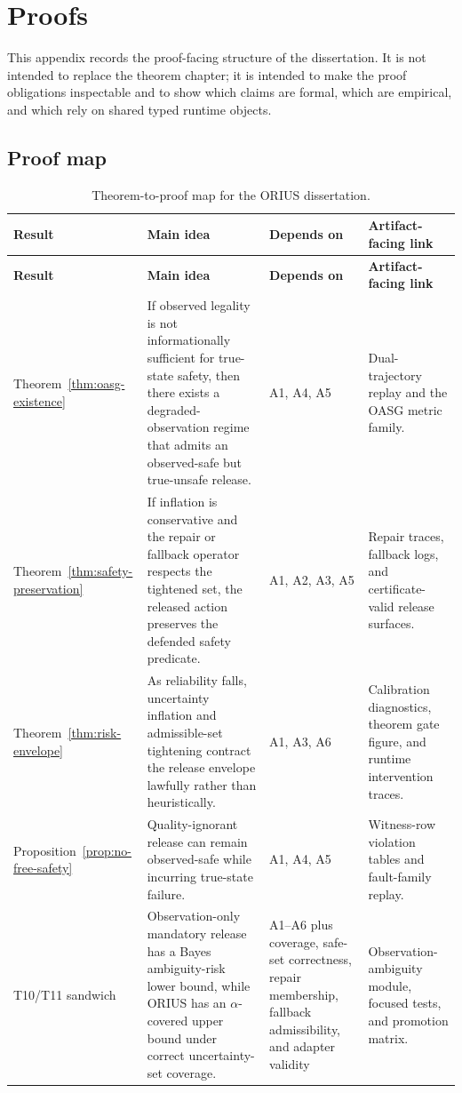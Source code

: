 \chapter{Proofs}
\label{app:proofs}

This appendix records the proof-facing structure of the dissertation. It is not intended to
replace the theorem chapter; it is intended to make the proof obligations inspectable and to
show which claims are formal, which are empirical, and which rely on shared typed runtime
objects.

\section{Proof map}
\begin{longtable}{p{}p{}p{}p{}}
\caption{Theorem-to-proof map for the ORIUS dissertation.}\label{tab:proof-map}\\
\toprule
\textbf{Result} & \textbf{Main idea} & \textbf{Depends on} & \textbf{Artifact-facing link}\\
\midrule
\endfirsthead
\toprule
\textbf{Result} & \textbf{Main idea} & \textbf{Depends on} & \textbf{Artifact-facing link}\\
\midrule
\endhead
Theorem~\ref{thm:oasg-existence} & If observed legality is not informationally sufficient for true-state safety, then there exists a degraded-observation regime that admits an observed-safe but true-unsafe release. & A1, A4, A5 & Dual-trajectory replay and the OASG metric family.\\
Theorem~\ref{thm:safety-preservation} & If inflation is conservative and the repair or fallback operator respects the tightened set, the released action preserves the defended safety predicate. & A1, A2, A3, A5 & Repair traces, fallback logs, and certificate-valid release surfaces.\\
Theorem~\ref{thm:risk-envelope} & As reliability falls, uncertainty inflation and admissible-set tightening contract the release envelope lawfully rather than heuristically. & A1, A3, A6 & Calibration diagnostics, theorem gate figure, and runtime intervention traces.\\
Proposition~\ref{prop:no-free-safety} & Quality-ignorant release can remain observed-safe while incurring true-state failure. & A1, A4, A5 & Witness-row violation tables and fault-family replay.\\
T10/T11 sandwich & Observation-only mandatory release has a Bayes ambiguity-risk lower bound, while ORIUS has an $\alpha$-covered upper bound under correct uncertainty-set coverage. & A1--A6 plus coverage, safe-set correctness, repair membership, fallback admissibility, and adapter validity & Observation-ambiguity module, focused tests, and promotion matrix.\\

\end{longtable}
